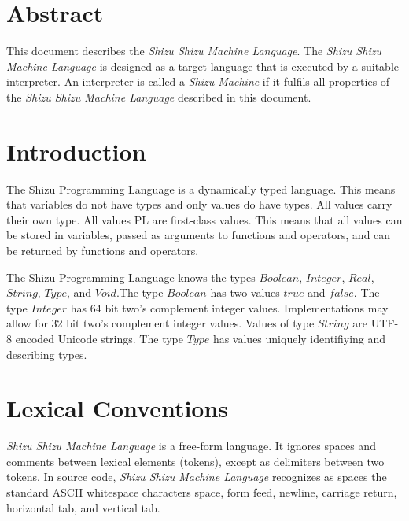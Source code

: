 \documentclass{article}
\title{\mylanguage{}}
\author{\myauthor}
\newcommand{\myproject}{Shizu}
\newcommand{\mymachine}{\myproject{} Machine}
\newcommand{\mylanguage}{\myproject{} \mymachine{} Language}
\begin{document}
\maketitle
\section{Abstract}
This document describes the \emph{\mylanguage{}}.
The \emph{\mylanguage{}} is designed as a target language that is executed by a suitable interpreter.
An interpreter is called a \emph{\mymachine{}} if it fulfils all properties of the \emph{\mylanguage{}} described in this document. 


\section{Introduction}
The \myproject{} Programming Language is a dynamically typed language. This means that variables do not have types and
only values do have types. All values carry their own type. All values PL are first-class values. This means that
all values can be stored in variables, passed as arguments to functions and operators, and can be returned by functions
and operators.

The \myproject{} Programming Language knows the types $\textit{Boolean}$, $\textit{Integer}$, $\textit{Real}$,
$\textit{String}$, $\textit{Type}$, and $\textit{Void}$.The type $\textit{Boolean}$ has two values $\textit{true}$
and $\textit{false}$. The type $\textit{Integer}$ has 64 bit two's complement integer values. Implementations may
allow for 32 bit two's complement integer values. Values of type $\textit{String}$ are UTF-8 encoded Unicode strings.
The type $\textit{Type}$ has values uniquely identifiying and describing types.

\noindent{}

\section{Lexical Conventions}
\emph{\mylanguage{}} is a free-form language. It ignores spaces and comments between lexical elements (tokens),
except as delimiters between two tokens. In source code, \emph{\mylanguage{}} recognizes as spaces the standard
ASCII whitespace characters space, form feed, newline, carriage return, horizontal tab, and vertical tab. 
\end{document}
